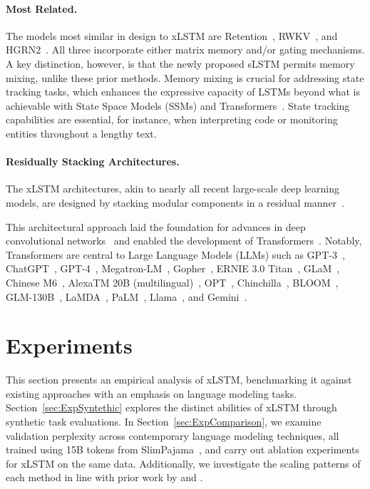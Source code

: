 \paragraph{Most Related.} The models most similar in design to xLSTM are Retention~\citep{Sun:23arxiv}, RWKV~\citep{Peng:23arxivshort,Peng:24arxivshort}, and HGRN2~\citep{Qin:24arxiv}. All three incorporate either matrix memory and/or gating mechanisms. A key distinction, however, is that the newly proposed sLSTM permits memory mixing, unlike these prior methods. Memory mixing is crucial for addressing state tracking tasks, which enhances the expressive capacity of LSTMs beyond what is achievable with State Space Models (SSMs) and Transformers~\citep{Merrill:24,Deletang:23}. State tracking capabilities are essential, for instance, when interpreting code or monitoring entities throughout a lengthy text.

\paragraph{Residually Stacking Architectures.} The xLSTM architectures, akin to nearly all recent large-scale deep learning models, are designed by stacking modular components in a residual manner~\citep{Srivastava:15,He:16}.

This architectural approach laid the foundation for advances in deep convolutional networks~\citep{He:16} and enabled the development of Transformers~\citep{Vaswani:17}. Notably, Transformers are central to Large Language Models (LLMs) such as GPT-3~\citep{Brown:20short}, ChatGPT~\citep{Schulman:22short}, GPT-4~\citep{Achiam:23gpt4short}, Megatron-LM~\citep{Shoeybi:19}, Gopher~\citep{Rae:21short}, ERNIE 3.0 Titan~\citep{Wang:21arxivshort}, GLaM~\citep{Du:21glamshort}, Chinese M6~\citep{Lin:21}, AlexaTM 20B (multilingual)~\citep{Soltan:22}, OPT~\citep{Zhang:22opt}, Chinchilla~\citep{Hoffmann:22short}, BLOOM~\citep{Scao:22arxivshort}, GLM-130B~\citep{Zeng:22arxivshort}, LaMDA~\citep{Thoppilan:22short}, PaLM~\citep{Chowdhery:22short}, Llama~\citep{Touvron:23arxiv}, and Gemini~\citep{GeminiTeam:23arxiv,Reid:24arxiv}.

\section{Experiments}
\label{sec:Exp}

This section presents an empirical analysis of xLSTM, benchmarking it against existing approaches with an emphasis on language modeling tasks. Section~\ref{sec:ExpSyntethic} explores the distinct abilities of xLSTM through synthetic task evaluations. In Section~\ref{sec:ExpComparison}, we examine validation perplexity across contemporary language modeling techniques, all trained using 15B tokens from SlimPajama~\citep{Soboleva:23}, and carry out ablation experiments for xLSTM on the same data. Additionally, we investigate the scaling patterns of each method in line with prior work by \citet{Kaplan:20} and \citet{Brown:20short}.

